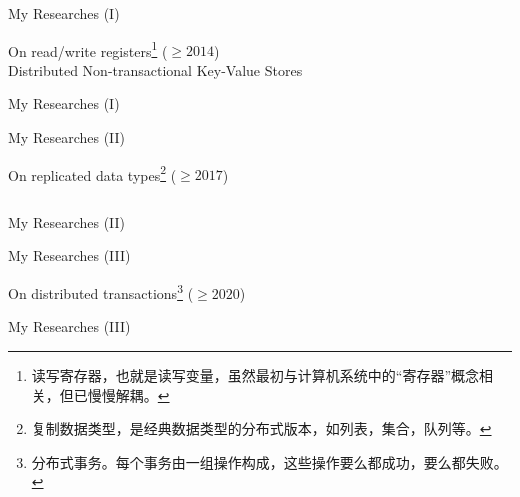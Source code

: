 \begin{frame}{My Researches (I)}
	\begin{center}
		On read/write registers\footnote{读写寄存器，也就是读写变量，虽然最初与计算机系统中的``寄存器''概念相关，但已慢慢解耦。} ($\ge 2014$) \\[6pt]

		Distributed Non-transactional Key-Value Stores
	\end{center}
\end{frame}

\begin{frame}{My Researches (I)}

	\vspace{0.30cm}

	\vspace{0.30cm}
\end{frame}

\begin{frame}{My Researches (II)}
	\begin{center}
		On replicated data types\footnote{复制数据类型，是经典数据类型的分布式版本，如列表，集合，队列等。} ($\ge 2017$) \\[6pt]

		\begin{columns}[c]
		\end{columns}
	\end{center}
\end{frame}

\begin{frame}{My Researches (II)}

	\vspace{0.30cm}

	\vspace{0.30cm}

	\vspace{0.30cm}
\end{frame}

\begin{frame}{My Researches (III)}
	\begin{center}
		On distributed transactions\footnote{
			分布式事务。每个事务由一组操作构成，这些操作要么都成功，要么都失败。} ($\ge 2020$) \\[6pt]

	\end{center}
\end{frame}

\begin{frame}{My Researches (III)}
\end{frame}
